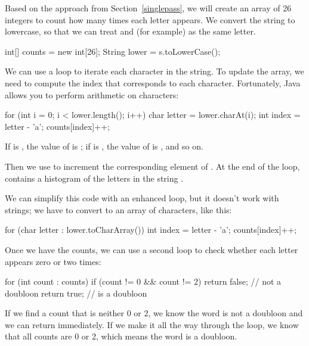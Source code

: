 Based on the approach from Section~\ref{singlepass}, we will create an array of 26 integers to count how many times each letter appears.
We convert the string to lowercase, so that we can treat  and  (for example) as the same letter.

\begin{code}
int[] counts = new int[26];
String lower = s.toLowerCase();
\end{code}

We can use a  loop to iterate each character in the string.
To update the  array, we need to compute the index that corresponds to each character.
Fortunately, Java allows you to perform arithmetic on characters:

\begin{code}
for (int i = 0; i < lower.length(); i++) {
    char letter = lower.charAt(i);
    int index = letter - 'a';
    counts[index]++;
}
\end{code}

If  is , the value of  is ;
if  is , the value of  is ,
and so on.

Then we use  to increment the corresponding element of .
At the end of the loop,  contains a histogram of the letters in the string .


We can simplify this code with an enhanced  loop, but it doesn't work with strings; we have to convert  to an array of characters, like this:

\begin{code}
for (char letter : lower.toCharArray()) {
    int index = letter - 'a';
    counts[index]++;
}
\end{code}

Once we have the counts, we can use a second  loop to check whether each letter appears zero or two times:

\begin{code}
for (int count : counts) {
    if (count != 0 && count != 2) {
        return false;  // not a doubloon
    }
}
return true;  // is a doubloon
\end{code}

If we find a count that is neither 0 or 2, we know the word is not a doubloon and we can return immediately.
If we make it all the way through the  loop, we know that all counts are 0 or 2, which means the word is a doubloon.

